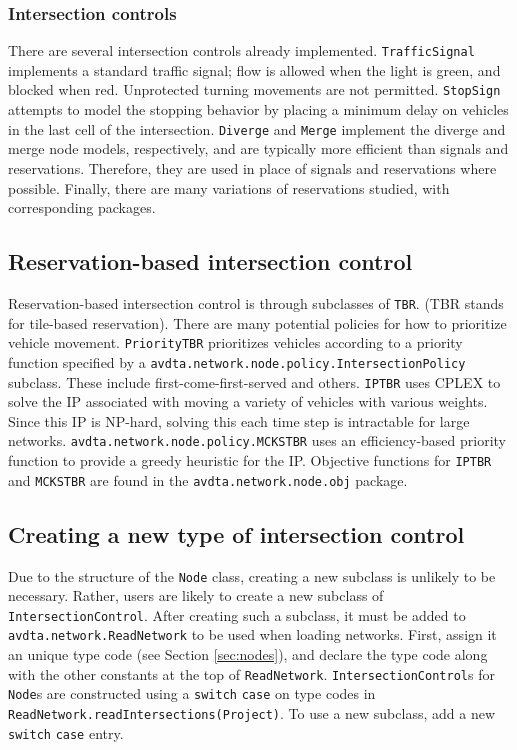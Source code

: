 \subsubsection{Intersection controls}

There are several intersection controls already implemented. \texttt{TrafficSignal} implements a standard traffic signal; flow is allowed when the light is green, and blocked when red. Unprotected turning movements are not permitted. \texttt{StopSign} attempts to model the stopping behavior by placing a minimum delay on vehicles in the last cell of the intersection. \texttt{Diverge} and \texttt{Merge} implement the diverge and merge node models, respectively, and are typically more efficient than signals and reservations. Therefore, they are used in place of signals and reservations where possible. Finally, there are many variations of reservations studied, with corresponding packages.

\subsection{Reservation-based intersection control}

Reservation-based intersection control is through subclasses of \texttt{TBR}. (TBR stands for tile-based reservation). There are many potential policies for how to prioritize vehicle movement. \texttt{PriorityTBR} prioritizes vehicles according to a priority function specified by a  \texttt{avdta.network.node.policy.IntersectionPolicy} subclass. These include first-come-first-served and others. \texttt{IPTBR} uses CPLEX to solve the IP associated with moving a variety of vehicles with various weights. Since this IP is NP-hard, solving this each time step is intractable for large networks. \texttt{avdta.network.node.policy.MCKSTBR} uses an efficiency-based priority function to provide a greedy heuristic for the IP. Objective functions for \texttt{IPTBR} and \texttt{MCKSTBR} are found in the \texttt{avdta.network.node.obj} package.

\subsection{Creating a new type of intersection control}

Due to the structure of the \texttt{Node} class, creating a new subclass is unlikely to be necessary. Rather, users are likely to create a new subclass of \texttt{IntersectionControl}. After creating such a subclass, it must be added to \texttt{avdta.network.ReadNetwork} to be used when loading networks. First, assign it an unique type code (see Section \ref{sec:nodes}), and declare the type code along with the other constants at the top of \texttt{ReadNetwork}. \texttt{IntersectionControl}s for \texttt{Node}s are constructed using a \texttt{switch} \texttt{case} on type codes in \texttt{ReadNetwork.readIntersections(Project)}. To use a new subclass, add a new \texttt{switch} \texttt{case} entry.


